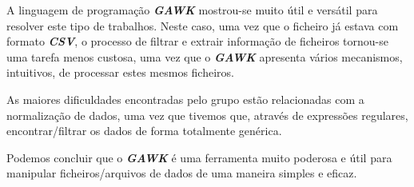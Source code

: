 \documentclass[11pt,a4paper]{report}
\begin{document}
\qquad A linguagem de programação \textbf{\textit{GAWK}} mostrou-se muito útil e versátil para resolver este tipo de trabalhos. Neste caso, uma vez que o ficheiro já estava com formato \textbf{\textit{CSV}}, o processo de filtrar e extrair informação de ficheiros tornou-se uma tarefa menos custosa, uma vez que o \textit{\textbf{GAWK}} apresenta vários mecanismos, intuitivos, de processar estes mesmos ficheiros.

\qquad As maiores dificuldades encontradas pelo grupo estão relacionadas com a normalização de dados, uma vez que tivemos que, através de expressões regulares, encontrar/filtrar os dados de forma totalmente genérica. 

\qquad Podemos concluir que o \textbf{\textit{GAWK}} é uma ferramenta muito poderosa e útil para manipular ficheiros/arquivos de dados de uma maneira simples e eficaz.
\end{document}
